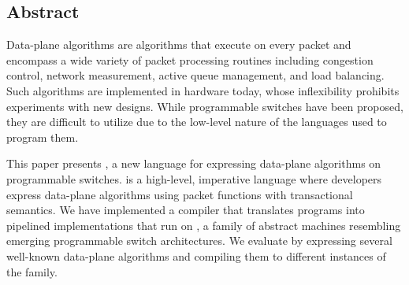 \subsection*{Abstract}

Data-plane algorithms are algorithms that execute on every packet and encompass
a wide variety of packet processing routines including congestion control,
network measurement, active queue management, and load balancing. Such 
algorithms are implemented in hardware today, whose inflexibility prohibits
experiments with new designs. While programmable switches have been proposed, 
they are difficult to utilize due to the low-level nature of the languages
used to program them.

This paper presents \pktlanguage, a new language for expressing data-plane
algorithms on programmable switches. \pktlanguage is a high-level, imperative
language where developers express data-plane algorithms using packet functions
with transactional semantics. We have implemented a compiler that translates
\pktlanguage programs into pipelined implementations that run on \absmachine, a
family of abstract machines resembling emerging programmable switch
architectures. We evaluate \pktlanguage by expressing several well-known
data-plane algorithms and compiling them to different instances of the
\absmachine family.
